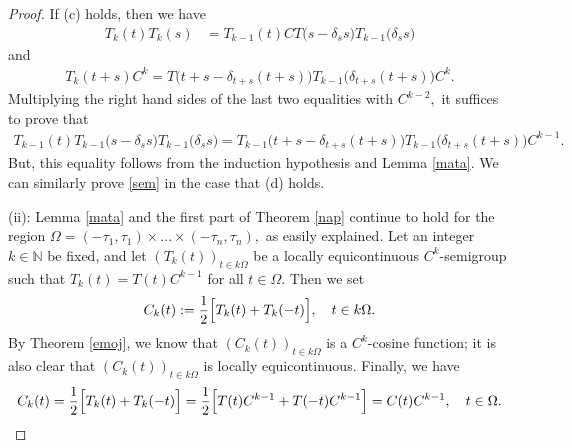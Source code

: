 \documentclass[10pt,a4paper]{amsart}
\begin{document}
\begin{proof}
If (c) holds, then we have
\begin{align*}
T_{k}(t)T_{k}(s) &=T_{k-1}(t)C T\bigl( s-\delta_{s}s\bigr)T_{k-1}\bigl( \delta_{s}s\bigr)
\end{align*}
and
\begin{align*}
T_{k}(t+s)C^{k}=T\bigl( t+s-\delta_{t+s}(t+s)\bigr)T_{k-1}\bigl( \delta_{t+s}(t+s)\bigr)C^{k} .
\end{align*}
Multiplying the right hand sides of the last two equalities with $C^{k-2},$ it suffices to prove that
\begin{align*}
T_{k-1}(t)  T_{k-1}\bigl( s-\delta_{s}s\bigr)T_{k-1}\bigl( \delta_{s}s\bigr)=T_{k-1}\bigl( t+s-\delta_{t+s}(t+s)\bigr)T_{k-1}\bigl( \delta_{t+s}(t+s)\bigr)C^{k-1}.
\end{align*}
But, this equality follows from the induction hypothesis and Lemma \ref{mata}.
We can similarly prove \eqref{sem} in the case that (d) holds.

(ii): Lemma \ref{mata} and the first part of Theorem \ref{nap} continue to hold for the region $\Omega =(-\tau_{1},\tau_{1}) \times ... \times (-\tau_{n},\tau_{n}),$ as easily explained. Let an  integer $k\in {\mathbb N} $ be fixed, and let $(T_{k}(t))_{t\in k\Omega}$ be a locally equicontinuous $C^{k}$-semigroup such that $T_{k}(t)=T(t)C^{k-1}$ for all $t\in \Omega.$  Then we set
$$
C_{k}(t):=\frac{1}{2}\Bigl[ T_{k}(t)+T_{k}(-t) \Bigr],\quad t\in k\Omega.
$$
By Theorem \ref{emoj}, we know that $(C_{k}(t))_{t\in k\Omega}$ is a $C^{k}$-cosine function; it is also clear that $(C_{k}(t))_{t\in k\Omega}$ is locally equicontinuous. Finally, we have
$$
C_{k}(t)=\frac{1}{2}\Bigl[ T_{k}(t)+T_{k}(-t) \Bigr]=\frac{1}{2}\Bigl[ T(t)C^{k-1}+T(-t)C^{k-1} \Bigr]=C(t)C^{k-1},\quad t\in \Omega.
$$
\end{proof}
\end{document}
